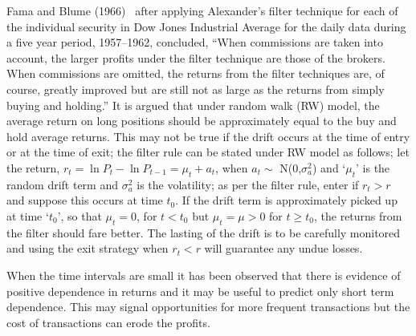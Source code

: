 Fama and Blume (1966)~\cite{famablume} after applying Alexander's filter technique for each of the individual security in Dow Jones Industrial Average for the daily data during a five year period, 1957--1962, concluded, ``When commissions are taken into account, the larger profits under the filter technique are those of the brokers. When commissions are omitted, the returns from the filter techniques are, of course, greatly improved but are still not as large as the returns from simply buying and holding.'' It is argued that under random walk (RW) model, the average return on long positions should be approximately equal to the buy and hold average returns. This may not be true if the drift occurs at the time of entry or at the time of exit; the filter rule can be stated under RW model as follows; let the return, $r_{t} = \ln{P_{t}} - \ln{P_{t-1}} = \mu_{t} + a_{t}$, when $a_{t} \sim$ N(0,$\sigma_{a}^2$) and `$\mu_{t}$' is the random drift term and $\sigma_{a}^2$ is the volatility; as per the filter rule, enter if $r_{t} > r$ and suppose this occurs at time $t_{0}$. If the drift term is approximately picked up at time `$t_{0}$', so that $\mu_{t} = 0$, for $t < t_{0}$ but $\mu_{t} = \mu > 0$ for $t \geq t_{0}$, the returns from the filter should fare better. The lasting of the drift is to be carefully monitored and using the exit strategy when $r_{t} < r$ will guarantee any undue losses.


When the time intervals are small it has been observed that there is evidence of positive dependence in returns and it may be useful to predict only short term dependence. This may signal opportunities for more frequent transactions but the cost of transactions can erode the profits.


